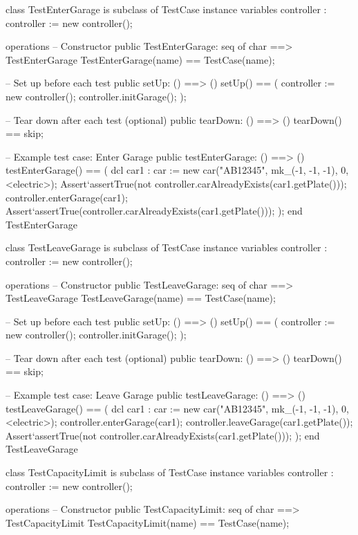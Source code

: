 \documentclass[a4paper]{article}
\begin{document}
\title{}
\author{}
\begin{vdm_al}
class TestEnterGarage is subclass of TestCase
instance variables
    controller : controller := new controller();

operations
    -- Constructor
    public TestEnterGarage: seq of char ==> TestEnterGarage
    TestEnterGarage(name) == TestCase(name);

    -- Set up before each test
    public setUp: () ==> ()
    setUp() == 
    (
        controller := new controller();
        controller.initGarage();
    );

    -- Tear down after each test (optional)
    public tearDown: () ==> ()
    tearDown() == skip;

  
    -- Example test case: Enter Garage
    public testEnterGarage: () ==> ()
    testEnterGarage() ==
    (
        dcl car1 : car := new car("AB12345", mk_(-1, -1, -1), 0, <electric>);
        Assert`assertTrue(not controller.carAlreadyExists(car1.getPlate()));
        controller.enterGarage(car1);
        Assert`assertTrue(controller.carAlreadyExists(car1.getPlate()));
    );
end TestEnterGarage

class TestLeaveGarage is subclass of TestCase
instance variables
    controller : controller := new controller();

operations
    -- Constructor
    public TestLeaveGarage: seq of char ==> TestLeaveGarage
    TestLeaveGarage(name) == TestCase(name);

    -- Set up before each test
    public setUp: () ==> ()
    setUp() == 
    (
        controller := new controller();
        controller.initGarage();
    );

    -- Tear down after each test (optional)
    public tearDown: () ==> ()
    tearDown() == skip;

  
    -- Example test case: Leave Garage
    public testLeaveGarage: () ==> ()
    testLeaveGarage() ==
    (
        dcl car1 : car := new car("AB12345", mk_(-1, -1, -1), 0, <electric>);
        controller.enterGarage(car1);
        controller.leaveGarage(car1.getPlate());
        Assert`assertTrue(not controller.carAlreadyExists(car1.getPlate()));
    );
end TestLeaveGarage

class TestCapacityLimit is subclass of TestCase
instance variables
    controller : controller := new controller();

operations
    -- Constructor
    public TestCapacityLimit: seq of char ==> TestCapacityLimit
    TestCapacityLimit(name) == TestCase(name);


\end{vdm_al}
\end{document}
